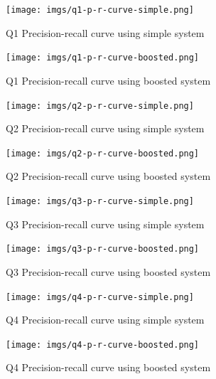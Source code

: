 \documentclass[sigconf]{acmart}
\begin{document}
\begin{figure}[H]
  \centering
  \texttt{[image: imgs/q1-p-r-curve-simple.png]}
  \caption{Q1 Precision-recall curve using simple system}
  \label{fig:q1_simple}
\end{figure}

\begin{figure}[H]
  \centering
  \texttt{[image: imgs/q1-p-r-curve-boosted.png]}
  \caption{Q1 Precision-recall curve using boosted system}
  \label{fig:q1_boosted}
\end{figure}


\begin{figure}[H]
  \centering
  \texttt{[image: imgs/q2-p-r-curve-simple.png]}
  \caption{Q2 Precision-recall curve using simple system}
  \label{fig:q2_simple}
\end{figure}

\begin{figure}[H]
  \centering
  \texttt{[image: imgs/q2-p-r-curve-boosted.png]}
  \caption{Q2 Precision-recall curve using boosted system}
  \label{fig:q2_boosted}
\end{figure}

\begin{figure}[H]
  \centering
  \texttt{[image: imgs/q3-p-r-curve-simple.png]}
  \caption{Q3 Precision-recall curve using simple system}
  \label{fig:q3_simple}
\end{figure}

\begin{figure}[H]
  \centering
  \texttt{[image: imgs/q3-p-r-curve-boosted.png]}
  \caption{Q3 Precision-recall curve using boosted system}
  \label{fig:q3_boosted}
\end{figure}

\begin{figure}[H]
  \centering
  \texttt{[image: imgs/q4-p-r-curve-simple.png]}
  \caption{Q4 Precision-recall curve using simple system}
  \label{fig:q4_simple}
\end{figure}

\begin{figure}[H]
  \centering
  \texttt{[image: imgs/q4-p-r-curve-boosted.png]}
  \caption{Q4 Precision-recall curve using boosted system}
  \label{fig:q4_boosted}
\end{figure}
\end{document}
